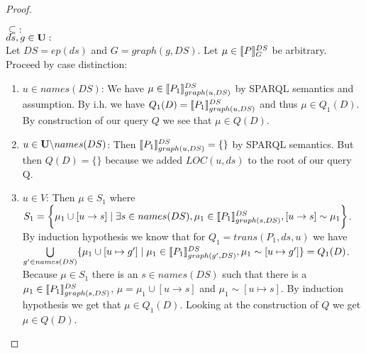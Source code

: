 \begin{proof}
\begin{enumerate}
		$\subseteq:$\\
		$ds,g \in \mathbf{U}:$ \\
		Let $DS = ep(ds)$ and $G = graph(g,DS)$.
		Let $\mu \in \llbracket P \rrbracket^{DS}_{G}$ be arbitrary.
		Proceed by case distinction:
		\begin{enumerate}
			\item $u \in names(DS)$: We have $\mu \in \llbracket P_1
				\rrbracket^{DS}_{graph(u,DS)}$ by SPARQL semantics and assumption. By i.h. we have 
				$Q_1(D) =  \llbracket P_1\rrbracket^{DS}_{graph(u,DS)}$ and thus $\mu \in
				Q_1(D)$. By
				construction of our query $Q$ we see that $\mu \in Q(D)$.

			\item $u \in \mathbf{U} \backslash names(DS)$:
				Then $\llbracket P_1 \rrbracket^{DS}_{graph(u,DS)} = \{\}$ by SPARQL semantics. But then
				$Q(D) = \{\}$ because we added $LOC(u,ds)$ to the root of our
				query Q.
			\item $u \in V$:
				Then $\mu \in S_1$ where $S_1 =  \bigg\{\mu_1 \cup [ u \rightarrow s ] \mid
					\exists s \in names(DS), \mu_1 \in \llbracket P_1
					\rrbracket^{DS}_{graph(s,DS)}, [ u \rightarrow s ] \sim
				\mu_1 \bigg\}$. 
				By induction hypothesis we know that for $Q_1
				= trans(P_1,ds,u)$ we have
				$\bigcup\limits_{g'\in names(DS)} \{ \mu_1 \cup [u\mapsto g'] \mid
					\mu_1 \in \llbracket P_1 \rrbracket^{DS}_{graph(g',DS)}, \mu_1 \sim [u
				\mapsto g']\} = Q_1(D)$. Because $\mu \in S_1$ there
				is an $s \in names(DS)$ such  that there is a $\mu_1 \in \llbracket P_1
				\rrbracket^{DS}_{graph(s,DS)}$, $\mu = \mu_1 \cup [u \rightarrow
				s]$ and  $\mu_1 \sim [u \mapsto s]$. By 
				induction hypothesis we get that $\mu \in Q_1(D)$.
				Looking at the construction of $Q$ we get $\mu \in Q(D)$.
		\end{enumerate}


\end{enumerate}
\end{proof}
